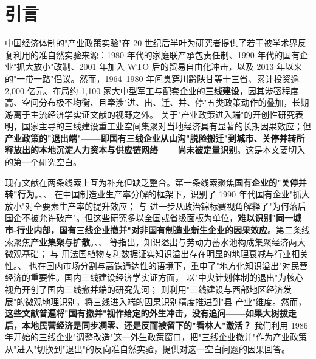 \section{引言}\label{sec:intro}

中国经济体制的"产业政策实验"在 20 世纪后半叶为研究者提供了若干被学术界反复利用的准自然实验来源：1980 年代的家庭联产承包责任制、1990 年代的国有企业"抓大放小"改制、2001 年加入 WTO 后的贸易自由化冲击，以及 2013 年以来的"一带一路"倡议。然而，1964--1980 年间贯穿川黔陕甘等十三省、累计投资逾 2{,}000 亿元、布局约 1{,}100 家大中型军工与配套企业的\textbf{三线建设}，因其涉密程度高、空间分布极不均衡、且牵涉"进、出、迁、并、停"五类政策动作的叠加，长期游离于主流经济学实证文献的视野之外。\citet{FanZou2021} 关于"产业政策进入端"的开创性研究表明，国家主导的三线建设重工业空间集聚对当地经济具有显著的长期因果效应；但\textbf{产业政策的"退出端"——即国有三线企业从山沟"脱险搬迁"到城市、关停并转所释放出的本地沉淀人力资本与供应链网络——尚未被定量识别}。这是本文要切入的第一个研究空白。

现有文献在两条线索上互为补充但缺乏整合。第一条线索聚焦\textbf{国有企业的"关停并转"行为}。\citet{hsieh2009}、\citet{brandt2013}、\citet{li2017} 在中国制造业生产率分解的框架下，识别了 1990 年代国有企业"抓大放小"对全要素生产率的提升效应；\citet{白重恩2016} 与 \citet{聂辉华2016} 进一步从政治锦标赛视角解释了"为何落后国企不被允许破产"。但这些研究多以全国或省级面板为单位，\textbf{难以识别"同一城市-行业内部，国有三线企业撤并"对非国有制造业新生企业的因果效应}。第二条线索聚焦\textbf{产业集聚与扩散}。\citet{marshall1920}、\citet{krugman1991}、\citet{combes2000} 等指出，知识溢出与劳动力蓄水池构成集聚经济两大微观基础；\citet{Combes2010} 与 \citet{marcon2003} 用法国植物专利数据证实知识溢出存在明显的地理衰减与行业相关性。\citet{FanZou2021}、\citet{陆铭2016} 也在国内市场分割与高铁通达性的语境下，重申了"地方化知识溢出"对民营经济的重要性。国内三线建设经济学实证方面，\citet{徐现祥2017} 以"中央计划体制的退出"为核心视角开创了国内三线撤并端的研究先河；\citet{刘冲2020} 则利用"三线建设与西部地区经济发展"的微观地理识别，将三线进入端的因果识别精度推进到"县-产业"维度。然而，\textbf{这些文献普遍将"国有撤并"视作给定的外生冲击，没有追问——如果大树拔走后，本地民营经济是同步凋零、还是反而被留下的"看林人"激活？} 我们利用 1986 年开始的三线企业"调整改造"这一外生政策窗口，把"三线企业撤并"作为产业政策从"进入"切换到"退出"的反向准自然实验，提供对这一空白问题的因果回答。

